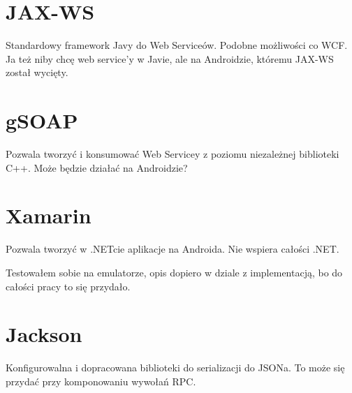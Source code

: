 \section{JAX-WS}
Standardowy framework Javy do Web Serviceów. Podobne możliwości co WCF. Ja też niby chcę web service'y w Javie, ale na Androidzie, któremu JAX-WS został wycięty.

\section{gSOAP}
Pozwala tworzyć i konsumować Web Servicey z poziomu niezależnej biblioteki C++. Może będzie działać na Androidzie?

\section{Xamarin}
Pozwala tworzyć w .NETcie aplikacje na Androida. Nie wspiera całości .NET.

Testowałem sobie na emulatorze, opis dopiero w dziale z implementacją, bo do całości pracy to się przydało.


\section{Jackson}
Konfigurowalna i dopracowana biblioteki do serializacji do JSONa. To może się przydać przy komponowaniu wywołań RPC.

%

